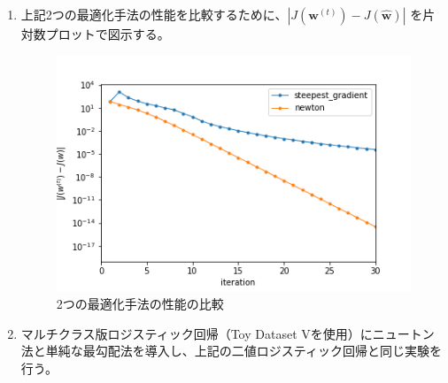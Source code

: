 \documentclass{jsarticle}
\begin{document}
\begin{enumerate}
  \item 上記2つの最適化手法の性能を比較するために、$|J(\bm w^{(t)}) - J(\hat{\bm w})|$ を片対数プロットで図示する。
  
  \begin{figure}[htbp]
    \centering
    \includegraphics[width=.7\textwidth]{image/1-3.png}
    \caption{2つの最適化手法の性能の比較}
  \end{figure}

  \item マルチクラス版ロジスティック回帰（Toy Dataset Vを使用）にニュートン法と単純な最勾配法を導入し、上記の二値ロジスティック回帰と同じ実験を行う。
  

\end{enumerate}
\end{document}
